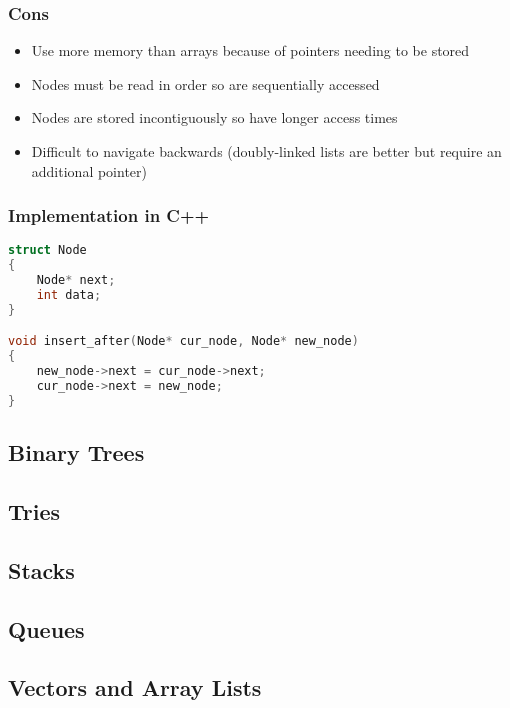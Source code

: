 \documentclass{article}
\begin{document}
\subsubsection{Cons}
\begin{itemize}
	\item Use more memory than arrays because of pointers needing to be stored
	
	\item Nodes must be read in order so are sequentially accessed
	
	\item Nodes are stored incontiguously so have longer access times
	
	\item Difficult to navigate backwards (doubly-linked lists are better but require an additional pointer)
	
\end{itemize}

\subsubsection{Implementation in C++}

\begin{lstlisting}[language=C++, caption={C++ code using listings}]
struct Node
{
	Node* next;
	int data;
}

void insert_after(Node* cur_node, Node* new_node)
{
	new_node->next = cur_node->next;
	cur_node->next = new_node;
}

\end{lstlisting}


\subsection{Binary Trees}

\subsection{Tries}

\subsection{Stacks}

\subsection{Queues}

\subsection{Vectors and Array Lists}
\end{document}
